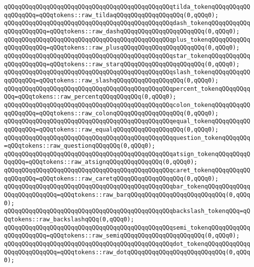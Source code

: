 \verb|qQQqqQQqqQQqqQQqqQQqqQQqqQQqqQQqqQQqqQQqqQQqqQQqtilda_tokenqQQqqQQqqQQqqQQqqQQq=qQQqtokens::raw_tildaqQQqqQQqqQQqqQQqqQQq(0,qQQq0);|\newline
\verb|qQQqqQQqqQQqqQQqqQQqqQQqqQQqqQQqqQQqqQQqqQQqqQQqdash_tokenqQQqqQQqqQQqqQQqqQQqqQQq=qQQqtokens::raw_dashqQQqqQQqqQQqqQQqqQQqqQQq(0,qQQq0);|\newline
\verb|qQQqqQQqqQQqqQQqqQQqqQQqqQQqqQQqqQQqqQQqqQQqqQQqplus_tokenqQQqqQQqqQQqqQQqqQQqqQQq=qQQqtokens::raw_plusqQQqqQQqqQQqqQQqqQQqqQQq(0,qQQq0);|\newline
\verb|qQQqqQQqqQQqqQQqqQQqqQQqqQQqqQQqqQQqqQQqqQQqqQQqstar_tokenqQQqqQQqqQQqqQQqqQQqqQQq=qQQqtokens::raw_starqQQqqQQqqQQqqQQqqQQqqQQq(0,qQQq0);|\newline
\verb|qQQqqQQqqQQqqQQqqQQqqQQqqQQqqQQqqQQqqQQqqQQqqQQqslash_tokenqQQqqQQqqQQqqQQqqQQq=qQQqtokens::raw_slashqQQqqQQqqQQqqQQqqQQq(0,qQQq0);|\newline
\verb|qQQqqQQqqQQqqQQqqQQqqQQqqQQqqQQqqQQqqQQqqQQqqQQqpercent_tokenqQQqqQQqqQQq=qQQqtokens::raw_percentqQQqqQQqqQQq(0,qQQq0);|\newline
\verb|qQQqqQQqqQQqqQQqqQQqqQQqqQQqqQQqqQQqqQQqqQQqqQQqcolon_tokenqQQqqQQqqQQqqQQqqQQq=qQQqtokens::raw_colonqQQqqQQqqQQqqQQqqQQq(0,qQQq0);|\newline
\verb|qQQqqQQqqQQqqQQqqQQqqQQqqQQqqQQqqQQqqQQqqQQqqQQqequal_tokenqQQqqQQqqQQqqQQqqQQq=qQQqtokens::raw_equalqQQqqQQqqQQqqQQqqQQq(0,qQQq0);|\newline
\verb|qQQqqQQqqQQqqQQqqQQqqQQqqQQqqQQqqQQqqQQqqQQqqQQqquestion_tokenqQQqqQQq=qQQqtokens::raw_questionqQQqqQQq(0,qQQq0);|\newline
\verb|qQQqqQQqqQQqqQQqqQQqqQQqqQQqqQQqqQQqqQQqqQQqqQQqatsign_tokenqQQqqQQqqQQqqQQq=qQQqtokens::raw_atsignqQQqqQQqqQQqqQQq(0,qQQq0);|\newline
\verb|qQQqqQQqqQQqqQQqqQQqqQQqqQQqqQQqqQQqqQQqqQQqqQQqcaret_tokenqQQqqQQqqQQqqQQqqQQq=qQQqtokens::raw_caretqQQqqQQqqQQqqQQqqQQq(0,qQQq0);|\newline
\verb|qQQqqQQqqQQqqQQqqQQqqQQqqQQqqQQqqQQqqQQqqQQqqQQqbar_tokenqQQqqQQqqQQqqQQqqQQqqQQqqQQq=qQQqtokens::raw_barqQQqqQQqqQQqqQQqqQQqqQQqqQQq(0,qQQq0);|\newline
\verb|qQQqqQQqqQQqqQQqqQQqqQQqqQQqqQQqqQQqqQQqqQQqqQQqbackslash_tokenqQQq=qQQqtokens::raw_backslashqQQq(0,qQQq0);|\newline
\verb|qQQqqQQqqQQqqQQqqQQqqQQqqQQqqQQqqQQqqQQqqQQqqQQqsemi_tokenqQQqqQQqqQQqqQQqqQQqqQQq=qQQqtokens::raw_semiqQQqqQQqqQQqqQQqqQQqqQQq(0,qQQq0);|\newline
\verb|qQQqqQQqqQQqqQQqqQQqqQQqqQQqqQQqqQQqqQQqqQQqqQQqdot_tokenqQQqqQQqqQQqqQQqqQQqqQQqqQQq=qQQqtokens::raw_dotqQQqqQQqqQQqqQQqqQQqqQQqqQQq(0,qQQq0);|\newline
